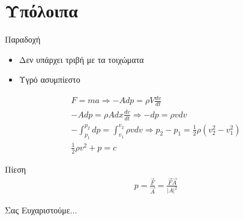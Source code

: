 \documentclass[greek]{beamer}
\begin{document}
\section{Υπόλοιπα}
\begin{frame}{}
  \begin{block}{Παραδοχή}
    \begin{itemize}
      \item Δεν υπάρχει τριβή με τα τοιχώματα
      \item Υγρό ασυμπίεστο
    \end{itemize}
  \end{block}
  \begin{gather*}
   F=ma \Rightarrow -Adp=ρV\frac{dv}{dt} \\
   -Adp=ρAdx\frac{dv}{dt} \Rightarrow -dp=ρv dv \\
   -\int_{p_1}^{p_2}dp=\int_{v_1}^{v_2}{ρv}dv \Rightarrow  p_2-p_1=\frac{1}{2}ρ(v_2^2-v_1^2) \\
   \frac{1}{2}ρv^2+p=c
  \end{gather*}
\end{frame}

\begin{frame}{Πίεση}
  \begin{gather*}
    p=\frac{\vec{F}}{\vec{A}}=\frac{\vec{F}\vec{A}}{\left| A \right|^2}
  \end{gather*}
\end{frame}

\begin{frame}[plain,c]
  \begin{center}
    \Huge Σας Ευχαριστούμε...
  \end{center}
\end{frame}
\end{document}
